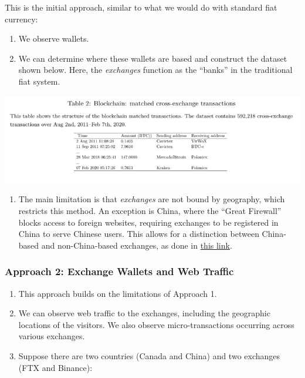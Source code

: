\documentclass[
  11pt,
]{article}
\providecommand{\tightlist}{%
  \setlength{\itemsep}{0pt}\setlength{\parskip}{0pt}}\usepackage{longtable,booktabs,array}
\begin{document}
This is the initial approach, similar to what we would do with standard
fiat currency:

\begin{enumerate}
\def\labelenumi{\arabic{enumi}.}
\tightlist
\item
  We observe wallets.
\item
  We can determine where these wallets are based and construct the
  dataset shown below. Here, the \emph{exchanges} function as the
  ``banks'' in the traditional fiat system.
\end{enumerate}

\includegraphics{images/Screenshot 2025-08-30 050944.png}

\begin{enumerate}
\def\labelenumi{\arabic{enumi}.}
\setcounter{enumi}{2}
\tightlist
\item
  The main limitation is that \emph{exchanges} are not bound by
  geography, which restricts this method. An exception is China, where
  the ``Great Firewall'' blocks access to foreign websites, requiring
  exchanges to be registered in China to serve Chinese users. This
  allows for a distinction between China-based and non-China-based
  exchanges, as done in
  \href{https://papers.ssrn.com/sol3/papers.cfm?abstract_id=3956933}{this
  link}.
\end{enumerate}

\subsubsection{Approach 2: Exchange Wallets and Web
Traffic}\label{approach-2-exchange-wallets-and-web-traffic}

\begin{enumerate}
\def\labelenumi{\arabic{enumi}.}
\tightlist
\item
  This approach builds on the limitations of Approach 1.
\item
  We can observe web traffic to the exchanges, including the geographic
  locations of the visitors. We also observe micro-transactions
  occurring across various exchanges.
\item
  Suppose there are two countries (Canada and China) and two exchanges
  (FTX and Binance):
\end{enumerate}
\end{document}
